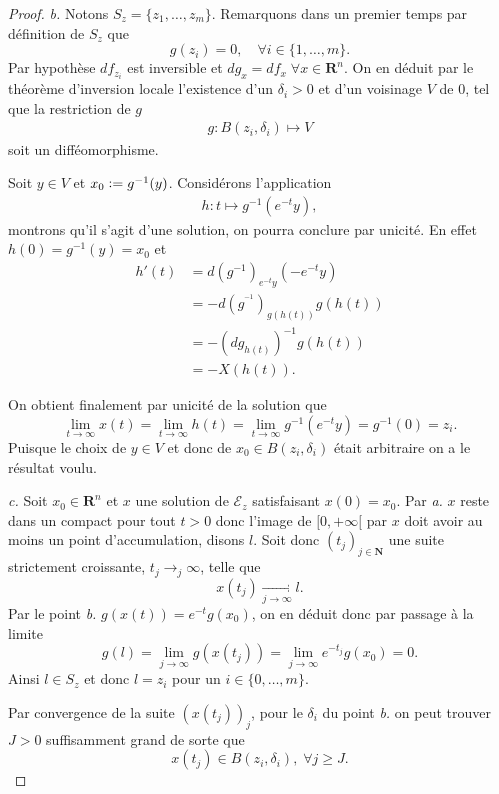 \documentclass[12pt]{article}
\newcommand{\defeq}{\vcentcolon=}
\newcommand{\R}{\mathbf{R}}
\newcommand{\N}{\mathbf{N}}
\begin{document}
\begin{proof}
\medskip

\textit{b.} Notons $S_{z} = \{z_1, \ldots, z_{m}\}$. Remarquons dans un premier temps par définition de $S_{z}$ que \[
        g(z_{i}) = 0, \quad \forall i \in \{1, \ldots, m\} 
.\] Par hypothèse $df_{z_{i}}$ est inversible et $dg_{x} = df_{x} \; \forall x \in \R^{n}$. On en déduit par le théorème d'inversion locale l'existence d'un $\delta_{i} > 0$ et d'un voisinage $V$ de 0, tel que la restriction de $g$
\begin{align*}
        g : B(z_{i}, \delta_{i}) \longmapsto V
\end{align*} soit un difféomorphisme.

Soit $y \in V$ et $x_0 \defeq g^{-1}(y)$. Considérons l'application
\begin{align*}
        h : t \longmapsto g^{-1}(e^{-t}y)
,\end{align*} montrons qu'il s'agit d'une solution, on pourra conclure par unicité.
En effet $h(0) = g^{-1}(y) = x_0$ et
\begin{align*}
        h'(t) &= d(g^{-1})_{e^{-t}y}(-e^{-t}y) \\
              &= -d(g^{^{-1}})_{g(h(t))}g(h(t)) \\
              &= -(dg_{h(t)})^{-1}g(h(t)) \\
              &= -X(h(t))
.\end{align*}

On obtient finalement par unicité de la solution que \[
        \lim_{t\to \infty}x(t) = \lim_{t\to \infty}h(t) = \lim_{t\to \infty}g^{-1}(e^{-t}y) = g^{-1}(0) = z_{i}
.\] Puisque le choix de $y \in V$ et donc de $x_0 \in B(z_{i}, \delta_{i})$ était arbitraire on a le résultat voulu. 

\medskip

\textit{c.} Soit $x_0 \in \R^{n}$ et $x$ une solution de $\mathcal{E}_{z}$ satisfaisant $x(0) = x_0$. Par \textit{a.} $x$ reste dans un compact pour tout $t > 0$ donc l'image de $[0, +\infty[$ par $x$ doit avoir au moins un point d'accumulation, disons $l$. Soit donc $(t_{j})_{j\in\N}$ une suite strictement croissante, $t_{j} \to_{j} \infty$, telle que \[
        x(t_{j}) \underset{j\to \infty}{\longrightarrow} l
.\] 
Par le point \textit{b.} $g(x(t)) = e^{-t}g(x_0)$, on en déduit donc par passage à la limite \[
        g(l) = \lim_{j\to \infty}g(x(t_{j})) = \lim_{j\to \infty}e^{-t_{j}}g(x_0) = 0
.\] Ainsi $l \in S_{z}$ et donc $l = z_{i}$ pour un $i \in \{0, \ldots, m\}$.

Par convergence de la suite $(x(t_{j}))_{j}$, pour le $\delta_{i}$ du point \textit{b.} on peut trouver $J > 0$ suffisamment grand de sorte que \[
x(t_{j}) \in B(z_{i}, \delta_{i}), \; \forall j \ge J
.\]


\end{proof}
\end{document}
